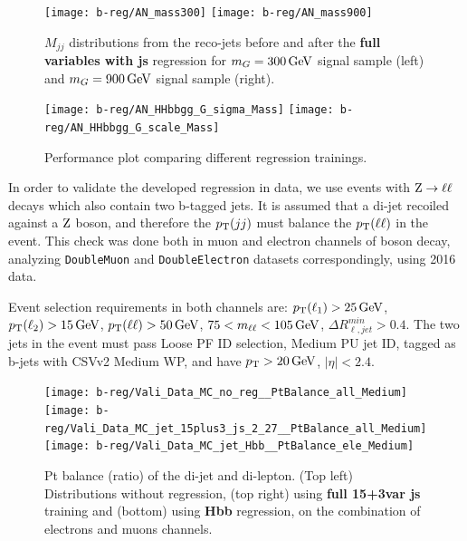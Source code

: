 \begin{figure}[h]
  \centering
  \texttt{[image: b-reg/AN\_mass300]}\hfil
  \texttt{[image: b-reg/AN\_mass900]}\hfil
  \caption{$M_{jj}$ distributions from the reco-jets before and after
    the \textbf{full variables with js} regression for $m_G=300\,\text{Ge\hspace{-.08em}V}$ signal sample
    (left) and $m_G=900\,\text{Ge\hspace{-.08em}V}$ signal sample (right).}
  \label{fig:b-reg-mH-fit-reco}
\end{figure}

\begin{figure}[h]
  \centering
  \texttt{[image: b-reg/AN\_HHbbgg\_G\_sigma\_Mass]}\hfil
  \texttt{[image: b-reg/AN\_HHbbgg\_G\_scale\_Mass]}\hfil
  \caption{Performance plot comparing different regression trainings.}
  \label{fig:b-reg-mH-res}
\end{figure}


In order to validate the developed regression in data, we use events with $\mathrm{Z}\to\ell\ell$ decays which also contain two b-tagged jets. 
It is assumed that a di-jet recoiled against a $\mathrm{Z}$ boson, and therefore the $p_{\mathrm{T}}(jj)$ must balance the $p_{\mathrm{T}}(\ell\ell)$ in the event.  
This check was done both in muon and electron channels of \Z boson decay, analyzing \verb|DoubleMuon| and \verb|DoubleElectron| datasets correspondingly, using 2016 data.

Event selection requirements in both channels are: $p_{\mathrm{T}}(\ell_1) > 25\,\text{Ge\hspace{-.08em}V}$,
$p_{\mathrm{T}}(\ell_2) > 15\,\text{Ge\hspace{-.08em}V}$, $p_{\mathrm{T}}(\ell\ell) > 50\,\text{Ge\hspace{-.08em}V}$,
$75<m_{\ell\ell}<105\,\text{Ge\hspace{-.08em}V}$, $\Delta R^{min}_{\ell, jet} > 0.4$. The two
jets in the event must pass Loose PF ID selection, Medium PU jet ID,
tagged as b-jets with CSVv2 Medium WP, and have $p_{\mathrm{T}}>20\,\text{Ge\hspace{-.08em}V}$,
$|\eta|<2.4$.

\begin{figure}[thb]
  \centering
  \texttt{[image: b-reg/Vali\_Data\_MC\_no\_reg\_\_PtBalance\_all\_Medium]}\hfil
  \texttt{[image: b-reg/Vali\_Data\_MC\_jet\_15plus3\_js\_2\_27\_\_PtBalance\_all\_Medium]}\hfil
  \texttt{[image: b-reg/Vali\_Data\_MC\_jet\_Hbb\_\_PtBalance\_ele\_Medium]}\hfil\\
  \caption{Pt balance (ratio) of the di-jet and di-lepton.  (Top left) Distributions without regression, (top right) using
    \textbf{full 15+3var js} training and (bottom) using
    \textbf{Hbb} regression, on the combination of electrons and muons channels.}
  \label{fig:vali-pt}
\end{figure}

